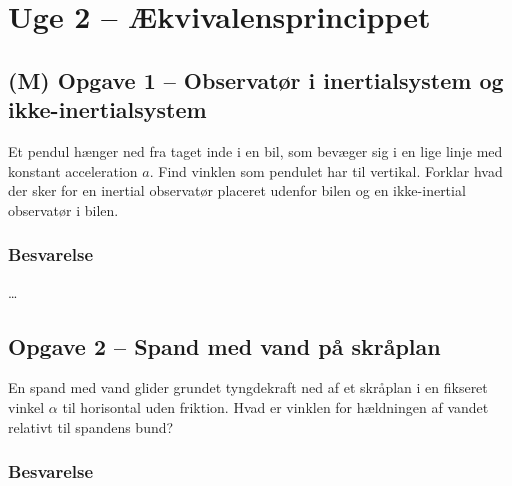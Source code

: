 \documentclass[../main.tex]{subfiles}
\begin{document}

\section{Uge 2 -- Ækvivalensprincippet}
\setcounter{section}{2}



\subsection{(M) Opgave 1 -- Observatør i inertialsystem og ikke-inertialsystem}
\setcounter{subsection}{1}
\setcounter{equation}{0}

Et pendul hænger ned fra taget inde i en bil, som bevæger sig i en lige linje med konstant acceleration $a$. Find vinklen som pendulet har til vertikal. Forklar hvad der sker for en inertial observatør placeret udenfor bilen og en ikke-inertial observatør i bilen.


\subsubsection{Besvarelse}

\ldots




\subsection{Opgave 2 -- Spand med vand på skråplan}
\setcounter{subsection}{2}
\setcounter{equation}{0}

En spand med vand glider grundet tyngdekraft ned af et skråplan i en fikseret vinkel $\alpha$ til horisontal uden friktion. Hvad er vinklen for hældningen af vandet relativt til spandens bund?


\subsubsection*{Besvarelse}
\end{document}
